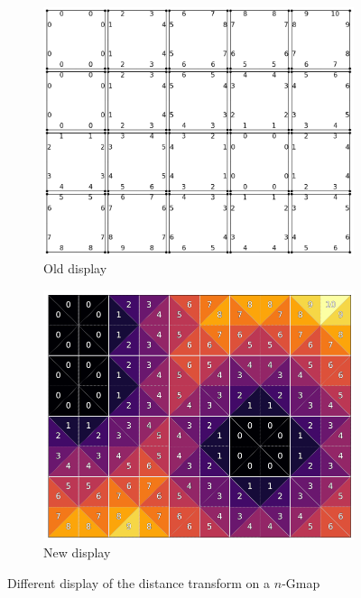 \begin{figure}[ht]
    \centering
    \begin{subfigure}{0.49\textwidth}
        \centering
        \includegraphics[width=\textwidth]{figures/gmap_dt_old.png}
        \caption{Old display}
        \label{fig:gmap_dt_old}
    \end{subfigure}
    \hfill
    \begin{subfigure}{0.49\textwidth}
        \centering
        \includegraphics[width=\textwidth]{figures/gmap_dt_new.png}
        \caption{New display}
        \label{fig:gmap_dt_new}
    \end{subfigure}
    \caption{Different display of the distance transform on a $n$-Gmap}
    \label{fig:gmap_dt}
\end{figure}

